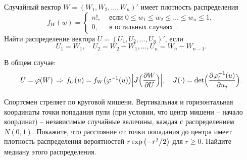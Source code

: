 \begin{problem}
Случайный вектор $W=(W_1, W_2, \ldots, W_n)'$ имеет плотность распределения 
$$
f_W(w)=\begin{cases}
n! , & \text{ если } 0\leqslant w_1\leqslant w_2\leqslant \ldots \leqslant w_n\leqslant 1, \\
0, & \text{ в остальных случаях }. 
\end{cases}
$$
Найти распределение вектора $U=(U_1, U_2, \ldots, U_n)'$, если 
$$
U_1=W_1, \quad U_2=W_2-W_1, \ldots, U_n=W_n-W_{n-1} . 
$$
\end{problem}

\begin{ordre}
В общем случае: 
$$
U=\varphi(W) \,\Rightarrow\, f_U(u)=f_W\bigl(\varphi^{-1}(u)\bigr) \Bigl| J\Bigl( \frac{\partial W}{\partial U}\Bigr)\Bigr|, \quad 
J(\cdot)=\det\Bigl( \frac{\partial \varphi_i^{-1}(u)}{\partial u_j}\Bigr) . 
$$
\end{ordre}


\begin{problem}
Спортсмен стреляет по круговой мишени. Вертикальная и горизонтальная 
координаты точки попадания пули (при условии, что центр мишени -- начало 
координат) -- независимые случайные величины, каждая с распределением 
$N(0,1)$. Покажите, что расстояние от точки попадания до центра имеет 
плотность распределения вероятностей $r\exp \left( {-{r^2} \mathord{\left/ 
{\vphantom {{r^2} 2}} \right. \kern-\nulldelimiterspace} 2} \right)$ для 
$r\ge 0$. Найдите медиану этого распределения.
\end{problem}